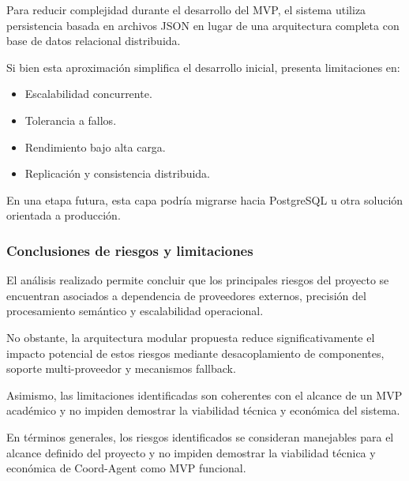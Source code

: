 Para reducir complejidad durante el desarrollo del MVP, el sistema utiliza persistencia basada en archivos JSON en lugar de una arquitectura completa con base de datos relacional distribuida.

Si bien esta aproximación simplifica el desarrollo inicial, presenta limitaciones en:

\begin{itemize}
    \item Escalabilidad concurrente.
    \item Tolerancia a fallos.
    \item Rendimiento bajo alta carga.
    \item Replicación y consistencia distribuida.
\end{itemize}

En una etapa futura, esta capa podría migrarse hacia PostgreSQL u otra solución orientada a producción.

\subsubsection{Conclusiones de riesgos y limitaciones}

El análisis realizado permite concluir que los principales riesgos del proyecto se encuentran asociados a dependencia de proveedores externos, precisión del procesamiento semántico y escalabilidad operacional.

No obstante, la arquitectura modular propuesta reduce significativamente el impacto potencial de estos riesgos mediante desacoplamiento de componentes, soporte multi-proveedor y mecanismos fallback.

Asimismo, las limitaciones identificadas son coherentes con el alcance de un MVP académico y no impiden demostrar la viabilidad técnica y económica del sistema.

En términos generales, los riesgos identificados se consideran manejables para el alcance definido del proyecto y no impiden demostrar la viabilidad técnica y económica de Coord-Agent como MVP funcional.